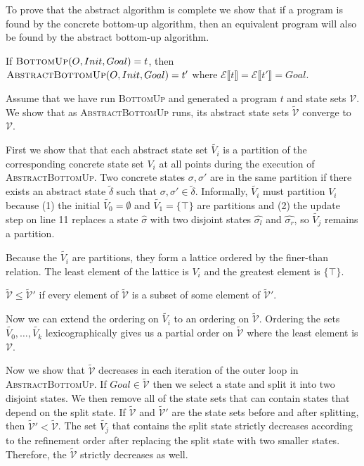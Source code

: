 \documentclass[authordraft,acmsmall,10pt]{acmart}
\newcommand{\abs}[1]{\ensuremath{\widetilde{#1}}}
\renewcommand{\eval}[1]{\ensuremath{\mathcal{E}\llbracket#1\rrbracket}}
\begin{document}
To prove that the abstract algorithm is complete we show that if a program is
found by the concrete bottom-up algorithm, then an equivalent program will also
be found by the abstract bottom-up algorithm.

\begin{theorem}
  If $\Call{BottomUp}{O, Init, Goal} = t$, then $\Call{AbstractBottomUp}{O,
    Init, Goal} = t'$ where $\eval{t} = \eval{t'} = Goal$.
\end{theorem}

Assume that we have run \textsc{BottomUp} and generated a program $t$ and state
sets $\mathcal{V}$. We show that as \textsc{AbstractBottomUp} runs, its abstract
state sets $\abs{\mathcal{V}}$ converge to $\mathcal{V}$.

First we show that that each abstract state set $\abs{V_i}$ is a partition of
the corresponding concrete state set $V_i$ at all points during the execution of
\textsc{AbstractBottomUp}. Two concrete states $\sigma, \sigma'$ are in the same
partition if there exists an abstract state $\abs{\delta}$ such that $\sigma,
\sigma' \in \abs{\delta}$. Informally, $\abs{V_i}$ must partition $V_i$ because
(1) the initial $\abs{V_0} = \emptyset$ and $\abs{V_1} = \{\top\}$ are
partitions and (2) the update step on line 11 replaces a state $\hat{\sigma}$
with two disjoint states $\hat{\sigma_l}$ and $\hat{\sigma_r}$, so $\abs{V_j}$
remains a partition.

Because the $\abs{V_i}$ are partitions, they form a lattice ordered by the
finer-than relation. The least element of the lattice is $V_i$ and the greatest
element is $\{\top\}$.

\begin{definition}
  $\abs{\mathcal{V}} \leq \abs{\mathcal{V}}'$ if every element of
  $\abs{\mathcal{V}}$ is a subset of some element of $\abs{\mathcal{V}}'$.
\end{definition}

Now we can extend the ordering on $\abs{V_i}$ to an ordering on
$\abs{\mathcal{V}}$. Ordering the sets $\abs{V_0}, \dots, \abs{V_k}$
lexicographically gives us a partial order on $\abs{\mathcal{V}}$ where the
least element is $\mathcal{V}$.

Now we show that $\abs{\mathcal{V}}$ decreases in each iteration of the outer
loop in \textsc{AbstractBottomUp}. If $Goal \in \abs{\mathcal{V}}$ then we
select a state and split it into two disjoint states. We then remove all of the
state sets that can contain states that depend on the split state. If
$\abs{\mathcal{V}}$ and $\abs{\mathcal{V}}'$ are the state sets before and after
splitting, then $\abs{\mathcal{V}}' < \abs{\mathcal{V}}$. The set $\abs{V_j}$
that contains the split state strictly decreases according to the refinement
order after replacing the split state with two smaller states. Therefore, the
$\abs{\mathcal{V}}$ strictly decreases as well.
\end{document}
